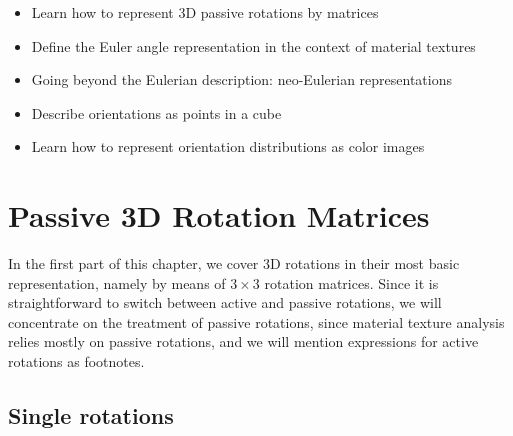 \begin{learningobjectives}
{\begin{itemize}
    \item[{\color{OCBurntOrange}\ref{\chabbr:sec:passive3D}:}] Learn how to represent 3D passive rotations by matrices
    \item[{\color{OCBurntOrange}\ref{\chabbr:sec:eulerangles}:}] Define the Euler angle representation in the context of material textures
    \item[{\color{OCBurntOrange}\ref{\chabbr:sec:neoEulerian}:}] Going beyond the Eulerian description: neo-Eulerian representations 
    \item[{\color{OCBurntOrange}\ref{\chabbr:sec:cubochoric}:}] Describe orientations as points in a cube
    \item[{\color{OCBurntOrange}\ref{\chabbr:sec:CliffordTorus}:}] Learn how to represent orientation distributions as color images
\end{itemize}}
\end{learningobjectives}

\section{Passive 3D Rotation Matrices}\label{\chabbr:sec:passive3D}

In the first part of this chapter, we cover 3D rotations in their most basic representation, namely by means of $3\times 3$ rotation matrices. Since it is straightforward to switch between active and passive rotations, we will concentrate on the treatment of passive rotations, since material texture analysis relies mostly on passive rotations, and we will mention expressions for active rotations as footnotes.

\subsection{Single rotations}\label{\chabbr:ssec:single3Drotationmatrices}

